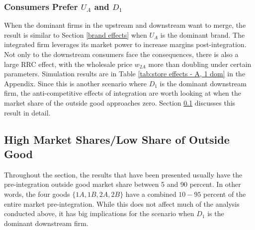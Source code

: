 \documentclass[12pt]{article}%
\begin{document}
\subsubsection{Consumers Prefer $U_A$ and $D_1$}
When the dominant firms in the upstream and downstream want to merge, the result is similar to Section \ref{brand effects} when $U_A$ is the dominant brand. The integrated firm leverages its market power to increase margins post-integration. Not only to the downstream consumers face the consequences, there is also a large RRC effect, with the wholesale price $w_{2A}$ more than doubling under certain parameters. Simulation results are in Table \ref{tab:store effects - A, 1 dom} in the Appendix. Since this is another scenario where $D_1$ is the dominant downstream firm, the anti-competitive effects of integration are worth looking at when the market share of the outside good approaches zero. Section \ref{high market share} discusses this result in detail.


\subsection{High Market Shares/Low Share of Outside Good} \label{high market share}
Throughout the section, the results that have been presented usually have the pre-integration outside good market share between 5 and 90 percent. In other words, the four goods $\{1A, 1B, 2A, 2B\}$ have a combined $10-95$ percent of the entire market pre-integration. While this does not affect much of the analysis conducted above, it has big implications for the scenario when $D_1$ is the dominant downstream firm. 
\end{document}
